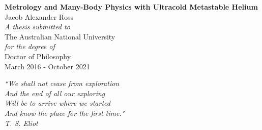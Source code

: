 \begin{titlepage}
\begin{center}
\vspace{0.45cm}
\LARGE{\textbf{Metrology and Many-Body Physics with Ultracold Metastable Helium\\}}
\vspace{0.5cm}
\large{Jacob Alexander Ross\\}
\mbox{}
\vfill
\vspace{0.15cm}
\normalsize{\emph{A thesis submitted to \\}}
\large{The Australian National University\\}
\normalsize{\emph{for the degree of\\}}
\large{Doctor of Philosophy \\}
\vspace{0.5cm}
\normalsize{March 2016 - October 2021}\\




\end{center}
\end{titlepage}


\pagebreak
\hspace{0pt}
\vfill
\begin{centering}
\noindent\emph{``We shall not cease from exploration\\
And the end of all our exploring \\
Will be to arrive where we started \\
And know the place for the first time."\\
\emph{T. S. Eliot}}\\ 
\end{centering}
\vfill
\hspace{0pt}
\pagebreak

